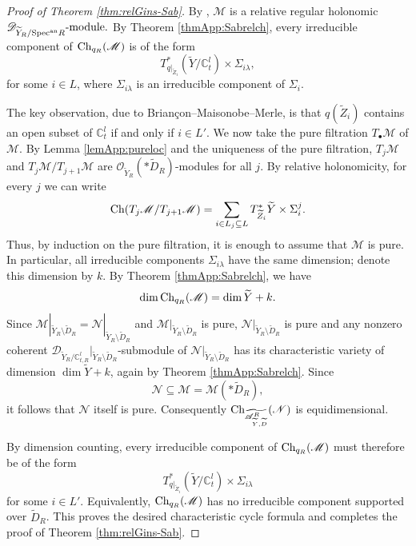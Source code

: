 \documentclass{amsart}
\theoremstyle{plain}
\numberwithin{theorem}{section}
\theoremstyle{definition}
\theoremstyle{remark}
\theoremstyle{definition}
\newcommand{\C}{\mathbb{C}} %
\newcommand{\cO}{\mathscr{O}}
\newcommand{\sM}{\mathscr{M}}
\newcommand{\sN}{\mathscr{N}}
\newcommand{\sA}{\mathscr{A}}
\newcommand{\shD}{\mathscr{D}}
\newcommand{\Specan}{\textup{Spec}^{\textup{an}}}
\newcommand{\Ch}{\textup{Ch}}
\begin{document}
\begin{proof}[Proof of Theorem \ref{thm:relGins-Sab}]
By \cite[Thm.1]{FFS23}, $\sM$ is a relative regular holonomic
$\shD_{\widetilde Y_R/\Specan R}\text{-module}.$
By Theorem \ref{thmApp:Sabrelch}, every irreducible component of
$\Ch_{q_R}(\sM)$ is of the form
\[
T^*_{q|_{\widetilde Z_i}}(\widetilde Y/\C_t^l)
\times
\Sigma_{i\lambda},
\]
for some $i\in L$, where $\Sigma_{i\lambda}$ is an irreducible component of
$\Sigma_i$.

The key observation, due to Brian\c{c}on--Maisonobe--Merle, is that
$q(\widetilde Z_i)$
contains an open subset of $\C_t^l$ if and only if $i\in L'$. We now take the
pure filtration $T_\bullet\sM$ of $\sM$. By Lemma \ref{lemApp:pureloc} and
the uniqueness of the pure filtration,
$T_j\sM$ and
$T_j\sM/T_{j+1}\sM$
are $\cO_{\widetilde Y_R}(*\widetilde D_R)$-modules for all $j$. By relative
holonomicity, for every $j$ we can write
\[
\Ch(T_j\sM/T_{j+1}\sM)
=
\sum_{i\in L_j\subseteq L}
T^*_{\widetilde Z_i}\widetilde Y\times \Sigma_i^j.
\]
Thus, by induction on the pure filtration, it is enough to assume that $\sM$
is pure. In particular, all irreducible components $\Sigma_{i\lambda}$ have
the same dimension; denote this dimension by $k$. By Theorem
\ref{thmApp:Sabrelch}, we have
\[
\dim \Ch_{q_R}(\sM)=\dim \widetilde Y+k.
\]
Since
$\sM|_{\widetilde Y_R\setminus \widetilde D_R}
=
\sN|_{\widetilde Y_R\setminus \widetilde D_R}$
and $\sM|_{\widetilde Y_R\setminus \widetilde D_R}$ is pure, $\sN|_{\widetilde Y_R\setminus \widetilde D_R}$
is pure and any nonzero
coherent
$\shD_{\widetilde Y_R/\C^l_{t,R}}
\big|_{\widetilde Y_R\setminus \widetilde D_R}$-submodule
of $\sN|_{\widetilde Y_R\setminus \widetilde D_R}$ has its characteristic variety
of dimension
$\dim \widetilde Y+k$,
again by Theorem \ref{thmApp:Sabrelch}. Since
\[
\sN\subseteq \sM=\sM(*\widetilde D_R),
\]
it follows that $\sN$ itself is pure. Consequently
$\Ch_{\widetilde{\sA^R_{\widetilde Y,\widetilde D}}}(\sN)$
is equidimensional.

By dimension counting, every irreducible component of $\Ch_{q_R}(\sM)$ must
therefore be of the form
\[
T^*_{q|_{\widetilde Z_i}}(\widetilde Y/\C_t^l)
\times
\Sigma_{i\lambda}
\]
for some $i\in L'$. Equivalently, $\Ch_{q_R}(\sM)$ has no irreducible
component supported over $\widetilde D_R$. This proves the desired
characteristic cycle formula and completes the proof of
Theorem \ref{thm:relGins-Sab}.
\end{proof}



 

\end{document}
